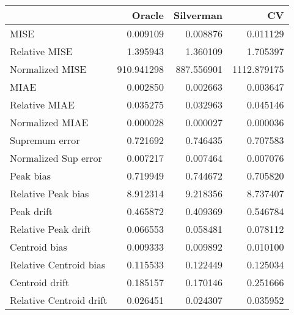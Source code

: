 \begin{tabular}{lrrr}
  \toprule
 & Oracle & Silverman & CV \\ 
  \midrule
MISE & 0.009109 & 0.008876 & 0.011129 \\ 
  Relative MISE & 1.395943 & 1.360109 & 1.705397 \\ 
  Normalized MISE & 910.941298 & 887.556901 & 1112.879175 \\ 
  MIAE & 0.002850 & 0.002663 & 0.003647 \\ 
  Relative MIAE & 0.035275 & 0.032963 & 0.045146 \\ 
  Normalized MIAE & 0.000028 & 0.000027 & 0.000036 \\ 
  Supremum error & 0.721692 & 0.746435 & 0.707583 \\ 
  Normalized Sup error & 0.007217 & 0.007464 & 0.007076 \\ 
  Peak bias & 0.719949 & 0.744672 & 0.705820 \\ 
  Relative Peak bias & 8.912314 & 9.218356 & 8.737407 \\ 
  Peak drift & 0.465872 & 0.409369 & 0.546784 \\ 
  Relative Peak drift & 0.066553 & 0.058481 & 0.078112 \\ 
  Centroid bias & 0.009333 & 0.009892 & 0.010100 \\ 
  Relative Centroid bias & 0.115533 & 0.122449 & 0.125034 \\ 
  Centroid drift & 0.185157 & 0.170146 & 0.251666 \\ 
  Relative Centroid drift & 0.026451 & 0.024307 & 0.035952 \\ 
   \bottomrule
\end{tabular}
